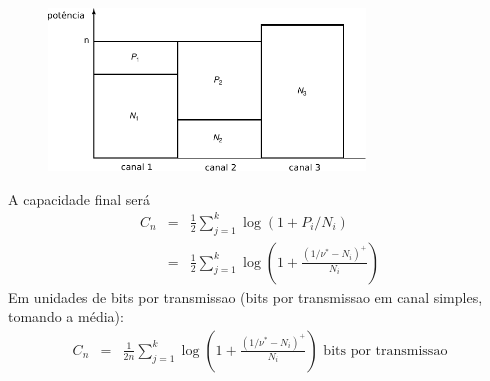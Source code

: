\begin{frame}[allowframebreaks]
     \begin{figure}[h!]
     \centering
     \includegraphics[width=0.75\textwidth]{images/waterfilling.pdf}
     \label{fig:waterfilling}
     \end{figure}

  \framebreak

  A capacidade final será
  \begin{eqnarray}
  C_n &=& \frac{1}{2} \sum_{j=1}^{k} \log (1 + P_i / N_i) \\
	&=& \frac{1}{2} \sum_{j=1}^{k} \log \left( 1 + \frac{(1/\nu^\ast - N_i)^{+}}{N_i} \right)
  \end{eqnarray} 
  Em unidades de bits por transmissao (bits por transmissao em canal simples, tomando a média):
  \begin{eqnarray}
  C_n &=& \frac{1}{2n} \sum_{j=1}^{k} \log \left( 1 + \frac{(1/\nu^\ast - N_i)^{+}}{N_i} \right) \text{ bits por transmissao}
  \end{eqnarray}

\end{frame}


